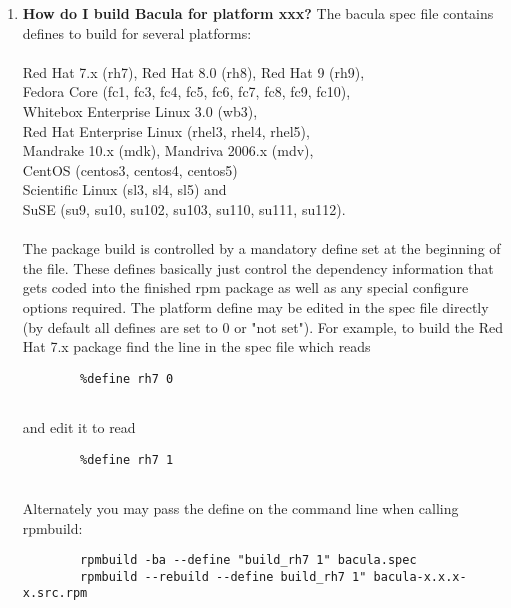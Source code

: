 \begin{enumerate}
\item 
   \label{faq1}
   {\bf How do I build Bacula for platform xxx?}
   The bacula spec file contains defines to build for several platforms: \\
   \\
   Red Hat 7.x (rh7), Red Hat 8.0 (rh8), Red Hat 9 (rh9), \\
   Fedora Core (fc1, fc3, fc4, fc5, fc6, fc7, fc8, fc9, fc10), \\
   Whitebox Enterprise Linux 3.0 (wb3), \\
   Red Hat Enterprise Linux (rhel3, rhel4, rhel5), \\
   Mandrake 10.x (mdk), Mandriva 2006.x (mdv), \\ 
   CentOS (centos3, centos4, centos5) \\ 
   Scientific Linux (sl3, sl4, sl5) and \\
   SuSE (su9, su10, su102, su103, su110, su111, su112). \\
   \\
   The package build is controlled by a mandatory define set at the beginning of the file.  These defines basically just control the dependency information that gets coded into the finished rpm package as well 
   as any special configure options required.  The platform define may be edited 
   in the spec file directly (by default all defines are set to 0 or "not set").  
   For example, to build the Red Hat 7.x package find the line in the spec file
   which reads

\footnotesize
\begin{verbatim}
        %define rh7 0
        
\end{verbatim}
\normalsize

and edit it to read  

\footnotesize
\begin{verbatim}
        %define rh7 1
        
\end{verbatim}
\normalsize

Alternately you may pass the define on the command line when calling rpmbuild:
 

\footnotesize
\begin{verbatim}
        rpmbuild -ba --define "build_rh7 1" bacula.spec
        rpmbuild --rebuild --define build_rh7 1" bacula-x.x.x-x.src.rpm
        
\end{verbatim}
\normalsize


\end{enumerate}
